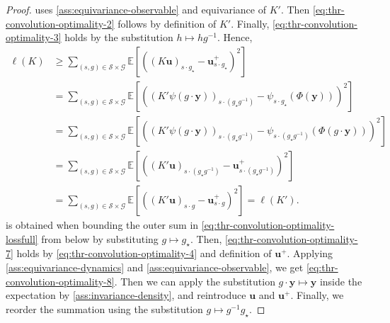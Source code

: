 \documentclass[preprint,12pt,authoryear]{elsarticle}
\newcommand{\lossfull}{\ell}
\newcommand\Gc{\mathcal G}
\newcommand\Sc{\mathcal S}
\begin{document}
{\begin{proof}
     uses \ref{ass:equivariance-observable} and equivariance of $K'$. Then \eqref{eq:thr-convolution-optimality-2} follows by definition of $K'$. Finally, \eqref{eq:thr-convolution-optimality-3} holds by the substitution $h \mapsto h g^{-1}$.
    Hence,
    \begin{align}
        \lossfull(K) 
        &\geq 
            \textstyle\sum_{(s,g) \in \Sc \times \Gc} \mathbb E [((K \bm u )_{s \cdot g_\star} - \bm u^+_{s \cdot g_\star})^2] 
            \label{eq:thr-convolution-optimality-6}
            \\
        &=
            \textstyle\sum_{(s,g) \in \Sc \times \Gc} \mathbb E [((K'\psi(g \cdot \bm y))_{s \cdot (g_\star g^{-1})} - \psi_{s \cdot g_\star}(\Phi(\bm y)))^2] 
            \label{eq:thr-convolution-optimality-7}
            \\
        &=
            \textstyle\sum_{(s,g) \in \Sc \times \Gc} \mathbb E [((K' \psi(g \cdot \bm y))_{s \cdot (g_\star g^{-1})} - \psi_{s \cdot (g_\star g^{-1})}(\Phi(g \cdot \bm y)))^2] 
            \label{eq:thr-convolution-optimality-8}
            \\
        &=
            \textstyle\sum_{(s,g) \in \Sc \times \Gc} \mathbb E [((K'\bm u)_{s \cdot (g_\star g^{-1})} - \bm u^+_{s \cdot  (g_\star g^{-1})})^2 ]
            \label{eq:thr-convolution-optimality-9}
            \\
        &=
            \textstyle\sum_{(s,g) \in \Sc \times \Gc} \mathbb E [((K'\bm u)_{s \cdot g} - \bm u^+_{s \cdot  g})^2]
            = \lossfull(K').
            \nonumber
    \end{align}
     is obtained when bounding the outer sum in \eqref{eq:thr-convolution-optimality-lossfull} from below by substituting $g \mapsto g_\star$. Then, \eqref{eq:thr-convolution-optimality-7} holds by \eqref{eq:thr-convolution-optimality-4} and definition of $\bm u^+$. Applying \ref{ass:equivariance-dynamics} and \ref{ass:equivariance-observable}, we get \eqref{eq:thr-convolution-optimality-8}. 
    Then we can apply the substitution $g \cdot \bm y \mapsto \bm y$ inside the expectation by \ref{ass:invariance-density}, and reintroduce $\bm u$ and $\bm u^+$. Finally, we reorder the summation using the substitution $g \mapsto g^{-1} g_\star$.
\end{proof}


}
\end{document}
